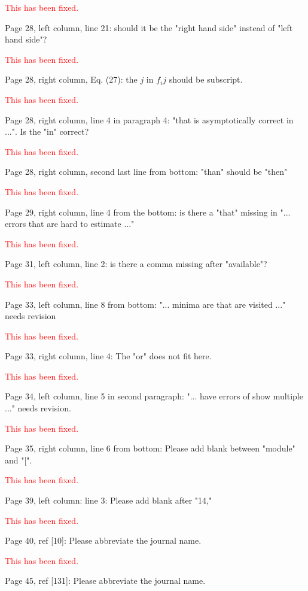 \documentclass[11pt,a4paper]{letter} %
\begin{document}
\begin{letter}
\textcolor{red}{This has been fixed.}

Page 28, left column, line 21: should it be the "right hand side" instead of "left hand side"?

\textcolor{red}{This has been fixed.}

Page 28, right column, Eq. (27): the $j$ in $f_ij$ should be subscript.

\textcolor{red}{This has been fixed.}

Page 28, right column, line 4 in paragraph 4: "that is asymptotically correct in ...". Is the "in" correct?

\textcolor{red}{This has been fixed.}

Page 28, right column, second last line from bottom: "than" should be "then"

\textcolor{red}{This has been fixed.}

Page 29, right column, line 4 from the bottom: is there a "that" missing in "... errors that are hard to estimate ..."

\textcolor{red}{This has been fixed.}

Page 31, left column, line 2: is there a comma missing after "available"?

\textcolor{red}{This has been fixed.}

Page 33, left column, line 8 from bottom: "... minima are that are visited ..." needs revision

\textcolor{red}{This has been fixed.}

Page 33, right column, line 4: The "or" does not fit here.

\textcolor{red}{This has been fixed.}

Page 34, left column, line 5 in second paragraph: "... have errors of show multiple ..." needs revision.

\textcolor{red}{This has been fixed.}

Page 35, right column, line 6 from bottom: Please add blank between "module" and "[".

\textcolor{red}{This has been fixed.}

Page 39, left column: line 3: Please add blank after "14,"

\textcolor{red}{This has been fixed.}

Page 40, ref [10]: Please abbreviate the journal name.

\textcolor{red}{This has been fixed.}

Page 45, ref [131]: Please abbreviate the journal name.


\end{letter}
\end{document}
